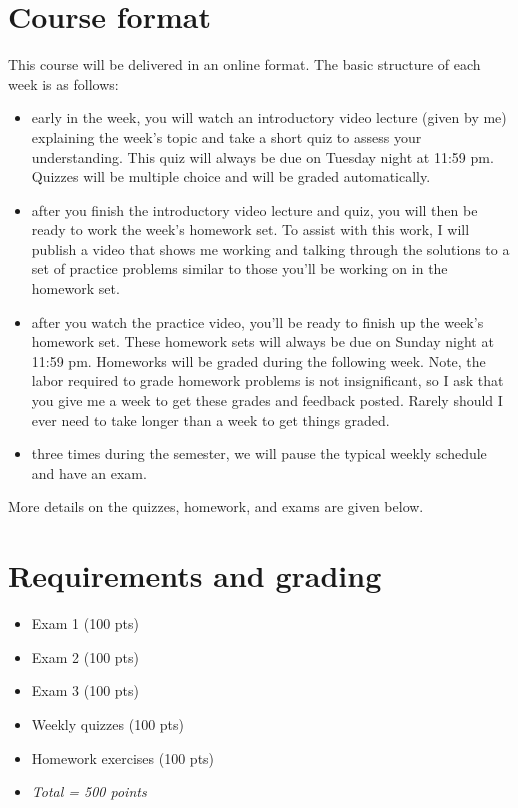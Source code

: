 \documentclass[10pt]{article}
\begin{document}
\section*{Course format}
\label{sec:orgac0f3f3}

This course will be delivered in an online format. The basic structure of each week is as follows:

\begin{itemize}
\item early in the week, you will watch an introductory video lecture (given by me) explaining the week's topic and take a short quiz to assess your understanding. This quiz will always be due on Tuesday night at 11:59 pm. Quizzes will be multiple choice and will be graded automatically.

\item after you finish the introductory video lecture and quiz, you will then be ready to work the week's homework set. To assist with this work, I will publish a video that shows me working and talking through the solutions to a set of practice problems similar to those you'll be working on in the homework set.

\item after you watch the practice video, you'll be ready to finish up the week's homework set. These homework sets will always be due on Sunday night at 11:59 pm. Homeworks will be graded during the following week. Note, the labor required to grade homework problems is not insignificant, so I ask that you give me a week to get these grades and feedback posted. Rarely should I ever need to take longer than a week to get things graded.

\item three times during the semester, we will pause the typical weekly schedule and have an exam.
\end{itemize}

More details on the quizzes, homework, and exams are given below.

\section*{Requirements and grading}
\label{sec:org058604b}
\begin{itemize}
\item Exam 1 (100 pts)
\item Exam 2 (100 pts)
\item Exam 3 (100 pts)
\item Weekly quizzes (100 pts)
\item Homework exercises (100 pts)
\item \emph{Total = 500 points}
\end{itemize}
\end{document}
